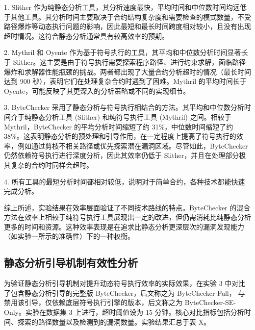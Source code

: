 \documentclass[print, master, vlined, timesmath]{DissertUESTC}
\begin{document}
1.  Slither 作为纯静态分析工具，其分析速度最快，平均时间和中位数时间均远低于其他工具。其分析时间主要取决于合约结构复杂度和需要检查的模式数量，不受路径爆炸等动态执行问题的影响，因此最短和最长时间跨度相对较小，且没有出现超时情况。这符合静态分析通常具有较高效率的预期。

2.  Mythril 和 Oyente 作为基于符号执行的工具，其平均和中位数分析时间显著长于 Slither。这主要是由于符号执行需要探索程序路径、进行约束求解，面临路径爆炸和求解器性能瓶颈的挑战。两者都出现了大量合约分析超时的情况（最长时间达到 900 秒），表明它们在处理复杂合约时遇到了困难。Mythril 的平均时间长于 Oyente，可能反映了其更深入的分析策略或不同的实现细节。

3.  ByteChecker 采用了静态分析与符号执行相结合的方法。其平均和中位数分析时间介于纯静态分析工具 (Slither) 和纯符号执行工具 (Mythril) 之间。相较于 Mythril，ByteChecker 的平均分析时间缩短了约 31\%，中位数时间缩短了约 38\%。这表明静态分析的预处理和引导作用，在一定程度上提高了符号执行的效率，例如通过剪枝不相关路径或优先探索潜在漏洞区域。尽管如此，ByteChecker 仍然依赖符号执行进行深度分析，因此其效率仍低于 Slither，并且在处理部分极其复杂的合约时同样会超时。

4.  所有工具的最短分析时间都相对较低，说明对于简单合约，各种技术都能快速完成分析。


综上所述，实验结果在效率层面验证了不同技术路线的特点。ByteChecker 的混合方法在效率上相较于纯符号执行工具展现出一定的改进，但仍需消耗比纯静态分析更多的时间和资源。这种效率表现是在追求比静态分析更深层次的漏洞发现能力（如实验一所示的准确性）下的一种权衡。


    
\subsection{静态分析引导机制有效性分析}
    
为验证静态分析引导机制对提升动态符号执行效率的实际效果，在实验 3 中对比了包含静态分析引导的完整版 ByteChecker，后文称之为 ByteChecker-Full， 与禁用该引导，仅依赖底层符号执行引擎的版本，后文称之为  ByteChecker-SE-Only。实验在数据集 3 上进行，超时阈值设为 15 分钟。核心对比指标包括分析时间、探索的路径数量以及检测到的漏洞数量。实验结果汇总于表 X。
\end{document}
